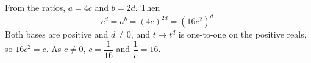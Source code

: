 From the ratios, $a=4c$ and $b=2d$. Then
\[c^d=a^b=(4c)^{2d}=\left(16c^2\right)^d.\]
Both bases are positive and $d\ne0$, and $t\mapsto t^d$ is one-to-one on the positive reals, so $16c^2=c$. As $c\ne0$, $c=\dfrac1{16}$ and $\dfrac1c=\boxed{16}$.
